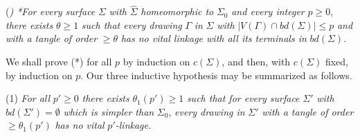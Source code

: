 (\textit{) *For every surface} $\Sigma$ \textit{with} $\hat{\Sigma}$ \textit{homeomorphic to} $\Sigma_0$ \textit{and every integer} $p \ge 0$, \textit{there exists} $\theta \ge 1$ \textit{such that every drawing} $\Gamma$ \textit{in} $\Sigma$ \textit{with} $|V(\Gamma) \cap bd(\Sigma)| \le p$ \textit{and with a tangle of order} $\ge \theta$ \textit{has no vital linkage with all its terminals in} $bd(\Sigma)$.

We shall prove (*) for all $p$ by induction on $c(\Sigma)$, and then, with $c(\Sigma)$ fixed, by induction on $p$. Our three inductive hypothesis may be summarized as follows.

\hspace*{12pt}(1) \textit{For all} $p' \ge 0$ \textit{there exists} $\theta_1(p') \ge 1$ \textit{such that for every surface} $\Sigma'$ \textit{with} $bd(\Sigma') = \emptyset$ \textit{which is simpler than} $\Sigma_0$, \textit{every drawing in} $\Sigma'$ \textit{with a tangle of order} $\ge \theta_1(p')$ \textit{has no vital} $p'$\textit{-linkage.}
